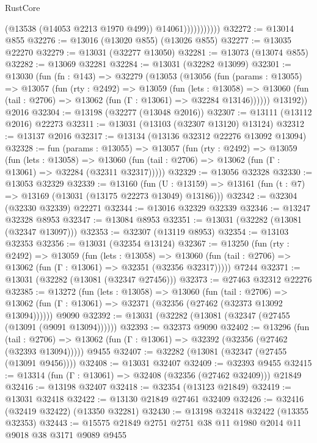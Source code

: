 \begin{lexlean}{RustCore}
\begin{coremodule}
                          (@13538 (@14053 @2213 @1970 @499))
                          @14061)))))))))))
@32272 := @13014 @855
@32276 := @13016 (@13020 @855) (@13026 @855)
@32277 := @13035 @22270
@32279 := @13031 (@32277 @13050)
@32281 := @13073 (@13074 @855)
@32282 := @13069 @32281
@32284 := @13031 (@32282 @13099)
@32301 := @13030
    (fun (fn : @143) =>
    @32279
      (@13053
        (@13056
          (fun (params : @13055) =>
          @13057
            (fun (rty : @2492) =>
            @13059
              (fun (lets : @13058) =>
              @13060 (fun (tail : @2706) => @13062 (fun (Γ : @13061) => @32284 @13146))))))
        @13192))
    @2016
@32304 := @13198 (@32277 (@13048 @2016))
@32307 := @13111 (@13112 @2016) @22273
@32311 := @13031 (@13103 (@32307 @13120) @13124)
@32312 := @13137 @2016
@32317 := @13134 (@13136 @32312 @22276 @13092 @13094)
@32328 := fun (params : @13055) =>
  @13057
    (fun (rty : @2492) =>
    @13059
      (fun (lets : @13058) =>
      @13060 (fun (tail : @2706) => @13062 (fun (Γ : @13061) => @32284 (@32311 @32317)))))
@32329 := @13056 @32328
@32330 := @13053 @32329
@32339 := @13160
    (fun (U : @13159) => @13161 (fun (t : @7) => @13169 (@13031 (@13175 @22273 @13049) @13186)))
@32342 := @32304 (@32330 @32339) @22271
@32344 := @13016 @32329 @32339
@32346 := @13247 @32328 @8953
@32347 := @13084 @8953
@32351 := @13031 (@32282 (@13081 (@32347 @13097)))
@32353 := @32307 (@13119 @8953)
@32354 := @13103 @32353
@32356 := @13031 (@32354 @13124)
@32367 := @13250
    (fun (rty : @2492) =>
    @13059
      (fun (lets : @13058) =>
      @13060 (fun (tail : @2706) => @13062 (fun (Γ : @13061) => @32351 (@32356 @32317)))))
    @7244
@32371 := @13031 (@32282 (@13081 (@32347 @27456)))
@32373 := @27463 @32312 @22276
@32385 := @13272
    (fun (lets : @13058) =>
    @13060
      (fun (tail : @2706) =>
      @13062 (fun (Γ : @13061) => @32371 (@32356 (@27462 (@32373 @13092 @13094))))))
    @9090
@32392 := @13031 (@32282 (@13081 (@32347 (@27455 (@13091 (@9091 @13094))))))
@32393 := @32373 @9090
@32402 := @13296
    (fun (tail : @2706) => @13062 (fun (Γ : @13061) => @32392 (@32356 (@27462 (@32393 @13094)))))
    @9455
@32407 := @32282 (@13081 (@32347 (@27455 (@13091 @9456))))
@32408 := @13031 @32407
@32409 := @32393 @9455
@32415 := @13314 (fun (Γ : @13061) => @32408 (@32356 (@27462 @32409))) @21849
@32416 := @13198 @32407
@32418 := @32354 (@13123 @21849)
@32419 := @13031 @32418
@32422 := @13130 @21849 @27461 @32409
@32426 := @32416 (@32419 @32422) (@13350 @32281)
@32430 := @13198 @32418 @32422 (@13355 @32353)
@32443 := @15575 @21849 @2751 @2751 @38 @11 @1980 @2014 @11 @9018 @38 @3171 @9089 @9455

\end{coremodule}
\end{lexlean}
